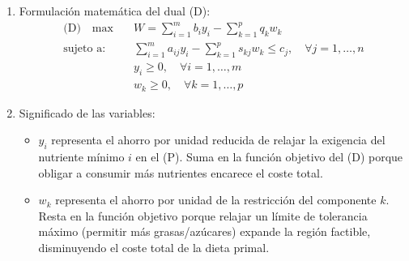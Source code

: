 \begin{enumerate}
    \item{Formulación matemática del dual (D):}
    \begin{align*}
    \text{(D)} \quad \max \quad & W = \sum_{i=1}^{m} b_i y_i - \sum_{k=1}^{p} q_k w_k \\
    \text{sujeto a:} \quad & \sum_{i=1}^{m} a_{ij} y_i - \sum_{k=1}^{p} s_{kj} w_k \le c_j, \quad \forall j = 1, \dots, n \\
    & y_i \ge 0, \quad \forall i = 1, \dots, m \\
    & w_k \ge 0, \quad \forall k = 1, \dots, p
    \end{align*}
    
    \item Significado de las variables:
    \begin{itemize}
        \item $y_i$ representa el ahorro por unidad reducida de relajar la exigencia del nutriente mínimo $i$ en el (P). Suma en la función objetivo del (D) porque obligar a consumir más nutrientes encarece el coste total.
        \item $w_k$ representa el ahorro por unidad de la restricción del componente $k$. Resta en la función objetivo porque relajar un límite de tolerancia máximo (permitir más grasas/azúcares) expande la región factible, disminuyendo el coste total de la dieta primal.
    \end{itemize}
\end{enumerate}